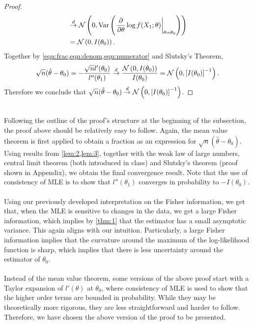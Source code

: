 \begin{proof}
\begin{align}
&\overset{d}{\rightarrow} \mathcal{N}\left(0, \text{Var}\left( \left.\frac{\partial}{\partial\theta}\log f(X_1;\theta)\right\vert_{\theta=\theta_0} \right)\right)\nonumber\\
&= \mathcal{N}\left( 0, I(\theta_0) \right). \label{eqn:numerator}
\end{align}
Together by \cref{eqn:frac,eqn:denom,eqn:numerator} and Slutsky's Theorem,
\begin{align*}
\sqrt{n}(\hat{\theta} - \theta_0) = -\frac{\sqrt{n}l'(\theta_0)}{l''(\theta_1)} \overset{d}{\rightarrow} \frac{\mathcal{N}\left(0,I(\theta_0)\right)}{I(\theta_0)} = \mathcal{N}\left(0, \left[ I(\theta_0) \right]^{-1}\right).
\end{align*}
Therefore we conclude that $\sqrt{n}(\hat{\theta} - \theta_0)\overset{d}{\rightarrow}\mathcal{N}\left(0, \left[ I(\theta_0) \right]^{-1}\right)$.
\end{proof}$ $\\
Following the outline of the proof's structure at the beginning of the subsection, the proof above should be relatively easy to follow. Again, the mean value theorem is first applied to obtain a fraction as an expression for $\sqrt{n}(\hat{\theta} - \theta_0)$. Using results from \cref{lem:2,lem:3}, together with the weak law of large numbers, central limit theorem (both introduced in class) and Slutsky's theorem (proof shown in Appendix), we obtain the final convergence result. Note that the use of consistency of MLE is to show that $l''(\theta_1)$ converges in probability to $-I(\theta_0)$.\\\\
Using our previously developed interpretation on the Fisher information, we get that, when the MLE is sensitive to changes in the data, we get a large Fisher information, which implies by \cref{thm:1} that the estimator has a small asymptotic variance. This again aligns with our intuition. Particularly, a large Fisher information implies that the curvature around the maximum of the log-likelihood function is sharp, which implies that there is less uncertainty around the estimator of $\theta_0$.\\\\
Instead of the mean value theorem, some versions of the above proof start with a Taylor expansion of $l'(\theta)$ at $\theta_0$, where consistency of MLE is used to show that the higher order terms are bounded in probability. While they may be theoretically more rigorous, they are less straightforward and harder to follow. Therefore, we have chosen the above version of the proof to be presented.\\\\
